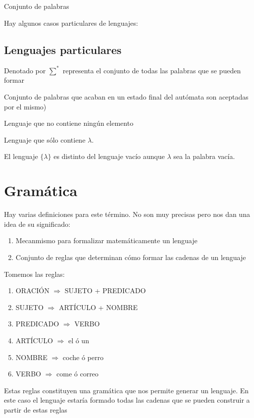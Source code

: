 \documentclass{apuntes}
\begin{document}
\begin{defn}[Lenguaje]
Conjunto de palabras
\end{defn}

Hay algunos casos particulares de lenguajes:
\subsection{Lenguajes particulares}
\begin{defn}
Denotado por $\sum^*$ representa el conjunto de todas las palabras que se pueden formar
\end{defn}

\begin{defn}
Conjunto de palabras que acaban en un estado final del autómata son aceptadas por el mismo)
\end{defn}

\begin{defn}
Lenguaje que no contiene ningún elemento
\end{defn}

\begin{defn}
Lenguaje que sólo contiene $\lambda$.
\end{defn}
El lenguaje $\lbrace \lambda \rbrace$ es distinto del lenguaje vacío aunque $\lambda$ sea la palabra vacía.

\section{Gramática}
\begin{defn}[Gramática]
Hay varias definiciones para este término. No son muy precisas pero nos dan una idea de su significado:
\begin{enumerate}
\item Mecanmismo para formalizar matemáticamente un lenguaje
\item Conjunto de reglas que determinan cómo formar las cadenas de un lenguaje
\end{enumerate}
\end{defn}

\begin{example}
Tomemos las reglas:
\begin{enumerate}
\item ORACIÓN $\Rightarrow$ SUJETO + PREDICADO
\item SUJETO $\Rightarrow$ ARTÍCULO + NOMBRE
\item PREDICADO $\Rightarrow$ VERBO
\item ARTÍCULO $\Rightarrow$ el ó un
\item NOMBRE $\Rightarrow$ coche ó perro
\item VERBO $\Rightarrow$ come ó correo
\end{enumerate}
Estas reglas constituyen una gramática que nos permite generar un lenguaje. En este caso el lenguaje estaría formado todas las cadenas que se pueden construir a partir de estas reglas
\end{example}
\end{document}

